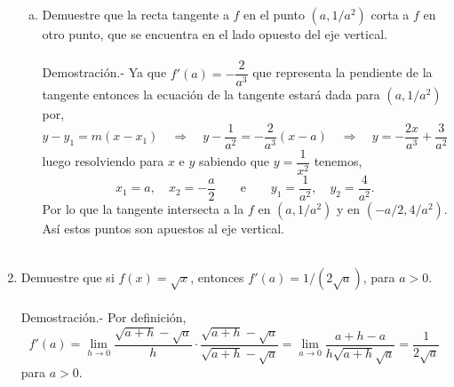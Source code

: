 \begin{enumerate}[\bfseries 1]
\begin{enumerate}[(a)]
	    \item Demuestre que la recta tangente a $f$ en el punto $(a,1/a^2)$ corta a $f$ en otro punto, que se encuentra en el lado opuesto del eje vertical.\\\\
		Demostración.-\; Ya que $f'(a)=-\dfrac{2}{a^3}$ que representa la pendiente de la tangente entonces la ecuación de la tangente estará dada para $(a,1/a^2)$ por,
		$$y-y_1=m(x-x_1)\quad \Rightarrow \quad y-\dfrac{1}{a^2}=-\dfrac{2}{a^3}(x-a)\quad \Rightarrow \quad y=-\dfrac{2x}{a^3}+\dfrac{3}{a^2}$$
		luego resolviendo para $x$ e $y$ sabiendo que $y=\dfrac{1}{x^2}$ tenemos,
		$$x_1 = a,\quad x_2 = -\dfrac{a}{2} \qquad \mbox{e}\qquad y_1 = \dfrac{1}{a^2}, \quad y_2=\dfrac{4}{a^2}.$$
		Por lo que la tangente intersecta a la $f$ en $(a,1/a^2)$ y en $(-a/2,4/a^2)$. Así estos puntos son apuestos al eje vertical.\\\\



	\end{enumerate}

    \item Demuestre que si $f(x) = \sqrt{x}$, entonces $f'(a) = 1/\left(2\sqrt{a}\right)$, para $a > 0$.\\\\
	Demostración.-\; Por definición,
	$$f'(a) = \lim_{h\to 0}\dfrac{\sqrt{a+h}-\sqrt{a}}{h} \cdot \dfrac{\sqrt{a+h}-\sqrt{a}}{\sqrt{a+h}-\sqrt{a}} = \lim_{a\to 0}\dfrac{a+h-a}{h\sqrt{a+h}\sqrt{a}} = \dfrac{1}{2\sqrt{a}}$$
	para $a>0$.\\\\


\end{enumerate}
